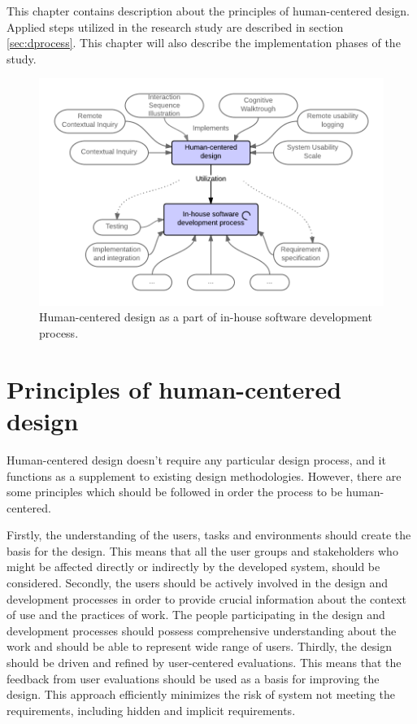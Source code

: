 \documentclass[12pt,a4paper,oneside,pdftex]{report}
\begin{document}
This chapter contains description about the principles of human-centered design. Applied steps utilized in the research study are described in section \ref{sec:dprocess}. This chapter will also describe the implementation phases of the study. 


\begin{figure}[H]
  	\centering
    	\includegraphics[width=1.0\textwidth]{./images/lm_process.png}
  	\caption{Human-centered design as a part of in-house software development process.\cite{RefWorks:16}}
	\label{fig:lm_process}
\end{figure}


\section{Principles of human-centered design}
\label{sec:principles}
Human-centered design doesn't require any particular design process, and it functions as a supplement to existing design methodologies. However, there are some principles which should be followed in order the process to be human-centered. \cite{RefWorks:16}

Firstly, the understanding of the users, tasks and environments should create the basis for the design. This means that all the user groups and stakeholders who might be affected directly or indirectly by the developed system, should be considered.
Secondly, the users should be actively involved in the design and development processes in order to provide crucial information about the context of use and the practices of work. The people participating in the design and development processes should possess comprehensive understanding about the work and should be able to represent wide range of users. Thirdly, the design should be driven and refined by user-centered evaluations. This means that the feedback from user evaluations should be used as a basis for improving the design. This approach efficiently minimizes the risk of system not meeting the requirements, including hidden and implicit requirements. \cite{RefWorks:16}
\end{document}
